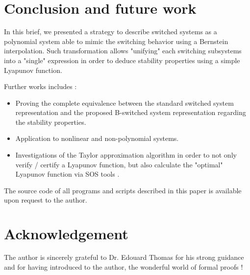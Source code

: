 \documentclass[12pt]{article}
\begin{document}
\section{Conclusion and future work}

In this brief, we presented a strategy to describe switched systems as a polynomial system able to mimic the switching behavior using a Bernstein interpolation. 
Such transformation allows "unifying" each switching subsystems into a "single" expression in order to deduce stability properties using a simple Lyapunov function.

Further works includes :
\begin{itemize}
 \item Proving the complete equivalence between the standard switched system representation and the proposed B-switched system representation regarding the stability properties.
 \item Application to nonlinear and non-polynomial systems.
 \item Investigations of the Taylor approximation algorithm in order to not only verify / certify a Lyapunov function, but also calculate the "optimal" Lyapunov function 
 via SOS tools \cite{SOS} \cite{Papa}. 
\end{itemize}
\noindent
The source code of all programs and scripts described in this paper is available upon request to the author.

\section*{Acknowledgement}

The author is sincerely grateful to Dr. Edouard Thomas for his strong guidance and for having introduced to the author, the wonderful world of formal proofs !
\end{document}
